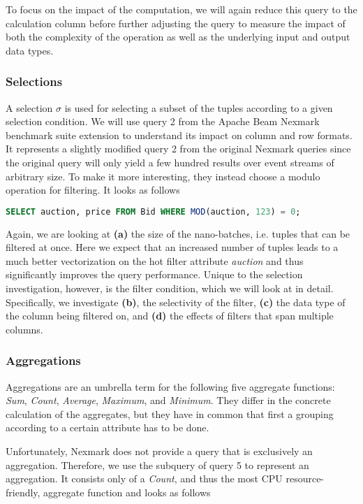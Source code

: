 To focus on the impact of the computation, we will again reduce this query to the calculation column before further adjusting the query to measure the impact of both the complexity of the operation as well as the underlying input and output data types.

\subsubsection{Selections}

A selection $\sigma$ is used for selecting a subset of the tuples according to a given selection condition.
We will use query 2 from the Apache Beam Nexmark benchmark suite extension to understand its impact on column and row formats. 
It represents a slightly modified query 2 from the original Nexmark queries since the original query will only yield a few hundred results over event streams of arbitrary size.
To make it more interesting, they instead choose a modulo operation for filtering.
It looks as follows

\begin{lstlisting}[language=SQL]
SELECT auction, price FROM Bid WHERE MOD(auction, 123) = 0;
\end{lstlisting}

Again, we are looking at \textbf{(a)} the size of the nano-batches, i.e. tuples that can be filtered at once.
Here we expect that an increased number of tuples leads to a much better vectorization on the hot filter attribute \emph{auction} and thus significantly improves the query performance.
Unique to the selection investigation, however, is the filter condition, which we will look at in detail.
Specifically, we investigate \textbf{(b)}, the selectivity of the filter, \textbf{(c)} the data type of the column being filtered on, and \textbf{(d)} the effects of filters that span multiple columns.

\subsubsection{Aggregations}
Aggregations are an umbrella term for the following five aggregate functions: \emph{Sum}, \emph{Count}, \emph{Average}, \emph{Maximum}, and \emph{Minimum}.
They differ in the concrete calculation of the aggregates, but they have in common that first a grouping according to a certain attribute has to be done.

Unfortunately, Nexmark does not provide a query that is exclusively an aggregation.
Therefore, we use the subquery of query 5 to represent an aggregation.
It consists only of a \emph{Count}, and thus the most CPU resource-friendly, aggregate function and looks as follows

